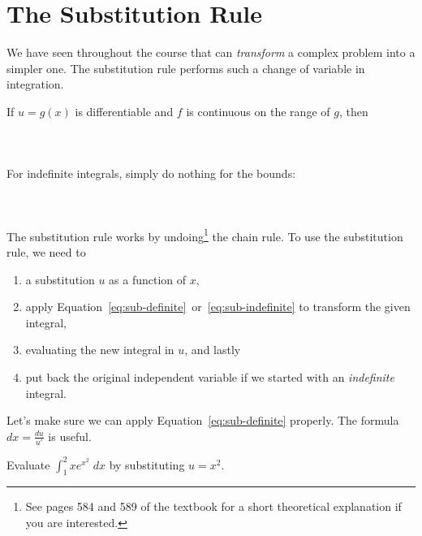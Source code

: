 \documentclass[../main.tex]{subfiles}
\begin{document}
 \section{The Substitution Rule}
  We have seen throughout the course that  can \emph{transform} a complex problem into a simpler one. The substitution rule performs such a change of variable in integration.
  \begin{mdframed}[style=withref]
    {If {\color{main} \(u = g(x)\)} is differentiable and \(f\) is continuous on the range of \(g\), then}
    \begin{equation} \label{eq:sub-definite}
      \phantom{\int_{a}^{b} f( {\color{main} g(x)} ) \, {\color{supp} g'(x) \;dx} = \int_{u(a)}^{u(b)} f({\color{main} u}) \;{\color{supp}du}.}
    \end{equation}

    For indefinite integrals, simply do nothing for the bounds: 
    \begin{equation} \label{eq:sub-indefinite}
      \phantom{\int f( {\color{main} g(x)} ) \, {\color{supp} g'(x) \;dx} = \int f(u) \;{\color{supp}du}}
    \end{equation}

  \end{mdframed}
  The substitution rule works by undoing\footnote{See pages 584 and 589 of the textbook for a short theoretical explanation if you are interested.} the chain rule. To use the substitution rule, we need to 
  \begin{enumerate}
    \item \underline{\hspace{1in}} a substitution $u$ as a function of $x$, 
    \item apply Equation~\eqref{eq:sub-definite}~or~\eqref{eq:sub-indefinite} to transform the given integral, 
    \item evaluating the new integral in $u$, and lastly
    \item put back the original independent variable if we started with an \emph{indefinite} integral.
  \end{enumerate}

  \medskip
  Let's make sure we can apply Equation~\eqref{eq:sub-definite} properly.  
  The formula \(dx = \frac{du}{u'}\) is useful.
  \begin{example} \label{ex:u-sub-2}
    Evaluate \(\int_{1}^{2} x e^{x^{2}} \;dx\) by substituting \(u = x^{2}\).
  \end{example}
  \clearpage
\end{document}
